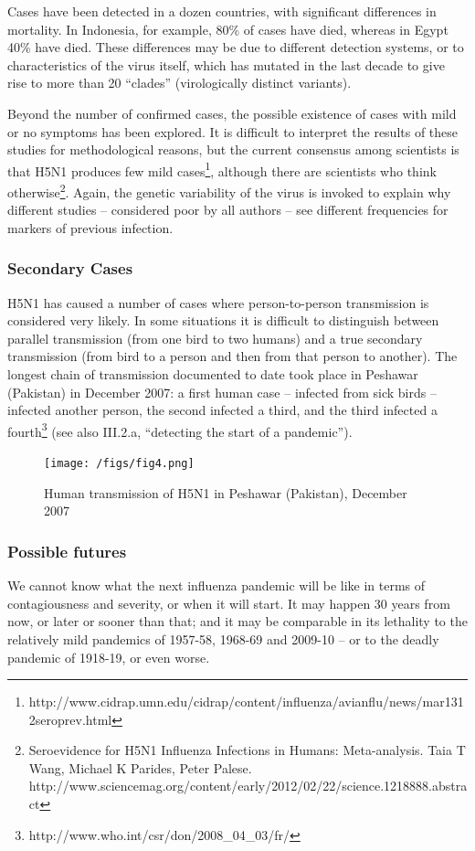 \documentclass[12pt, a4]{scrartcl}
\begin{document}
Cases have been detected in a dozen countries, with significant differences in mortality. In Indonesia, for example, 80\% of cases have died, whereas in Egypt 40\% have died. These differences may be due to different detection systems, or to characteristics of the virus itself, which has mutated in the last decade to give rise to more than 20 “clades” (virologically distinct variants). 

Beyond the number of confirmed cases, the possible existence of cases with mild or no symptoms has been explored. It is difficult to interpret the results of these studies for methodological reasons, but the current consensus among scientists is that H5N1 produces few mild cases\footnote{http://www.cidrap.umn.edu/cidrap/content/influenza/avianflu/news/mar1312seroprev.html}, although there are scientists who think otherwise\footnote{Seroevidence for H5N1 Influenza Infections in Humans: Meta-analysis. Taia T Wang, Michael K Parides, Peter Palese. http://www.sciencemag.org/content/early/2012/02/22/science.1218888.abstract}. Again, the genetic variability of the virus is invoked to explain why different studies – considered poor by all authors – see different frequencies for markers of previous infection.

\subsubsection {Secondary Cases}
H5N1 has caused a number of cases where person-to-person transmission is considered very likely. In some situations it is difficult to distinguish between parallel transmission (from one bird to two humans) and a true secondary transmission (from bird to a person and then from that person to another). The longest chain of transmission documented to date took place in Peshawar (Pakistan) in December 2007: a first human case – infected from sick birds – infected another person, the second infected a third, and the third infected a fourth\footnote{http://www.who.int/csr/don/2008_04_03/fr/} (see also III.2.a, “detecting the start of a pandemic”).

\begin{figure}[h]
\centering
\texttt{[image: /figs/fig4.png]}
\caption{Human transmission of H5N1 in Peshawar (Pakistan), December 2007}
\end{figure}

\subsubsection{Possible futures}
We cannot know what the next influenza pandemic will be like in terms of contagiousness and severity, or when it will start. It may happen 30 years from now, or later or sooner than that; and it may be comparable in its lethality to the relatively mild pandemics of 1957-58, 1968-69 and 2009-10 – or to the deadly pandemic of 1918-19, or even worse.
\end{document}
